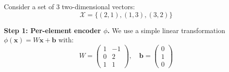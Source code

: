 \begin{example}\label{ex:deepsets_numerical}
Consider a set of 3 two-dimensional vectors:
\begin{equation}
\mathcal{X} = \{(2, 1), (1, 3), (3, 2)\}
\end{equation}

\textbf{Step 1: Per-element encoder $\phi$.} We use a simple linear transformation $\phi(\mathbf{x}) = W\mathbf{x} + \mathbf{b}$ with:
\begin{equation}
W = \begin{pmatrix} 1 & -1 \\ 0 & 2 \\ 1 & 1 \end{pmatrix}, \quad \mathbf{b} = \begin{pmatrix} 0 \\ 1 \\ 0 \end{pmatrix}
\end{equation}


\end{example}
